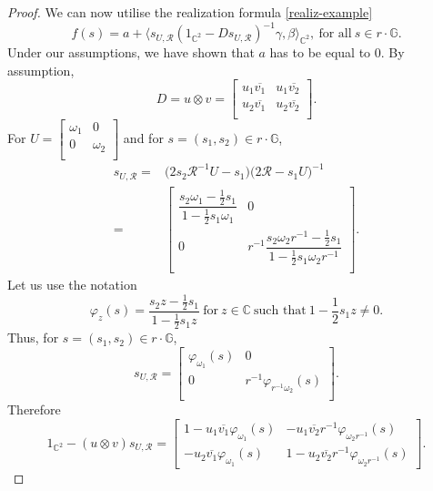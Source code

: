\documentclass[12pt,reqno]{amsart}
\numberwithin{equation}{section}
\renewcommand\phi{\varphi}
\theoremstyle{definition}
\begin{document}
\begin{proof}
We can now utilise the realization formula \eqref{realiz-example}
\begin{equation}\label{realiz-example-2}
f(s)=a+\langle s_{U,\mathcal{R}}(1_{\mathbb{C}^{2}}-Ds_{U,\mathcal{R}})^{-1}\gamma, \beta \rangle_{\mathbb{C}^{2}}, \ \text{for all} \ s\in r\cdot\mathbb{G}.
\end{equation}
Under our assumptions, we have shown that $a$ has to be equal to $0$. By assumption, 
$$D =u\otimes v = \begin{bmatrix}
    u_{1}\overline{v_{1}} & u_{1}\overline{v_{2}} \\
    u_{2}\overline{v_{1}} & u_{2}\overline{v_{2}} \\
\end{bmatrix}.$$
For $U=\begin{bmatrix}
\omega_{1} & 0 \\
0 & \omega_{2} \\
\end{bmatrix}$ and for $s= (s_1, s_2) \in r\cdot\mathbb{G}$,
\begin{align}
s_{U,\mathcal{R}} = & \bigg(2s_{2}\mathcal{R}^{-1}U-s_{1}\bigg)\bigg(2\mathcal{R}-s_{1}U\bigg)^{-1}\\
  =&  \begin{bmatrix}
   \dfrac{s_{2} \omega_1-\frac{1}{2}s_{1}}{1-\frac{1}{2}s_{1} \omega_1}  & 0 \\
    0 &  r^{-1} \dfrac{s_{2}\omega_{2}r^{-1} -\frac{1}{2}s_{1}}{1-\frac{1}{2}s_{1} \omega_{2}r^{-1}   } \\
\end{bmatrix}.
\end{align}
Let us use the notation
$$
\phi_{z}(s) = \dfrac{s_{2}z-\frac{1}{2}s_{1}}{1-\frac{1}{2}s_{1}z} \ \text{for} \ z\in\mathbb{C} \ \text{such that}~1-\frac{1}{2}s_{1}z\neq0.
$$
Thus, for $s= (s_1, s_2) \in r\cdot\mathbb{G}$, 
$$ s_{U,\mathcal{R}} = \begin{bmatrix}
 \phi_{\omega_1}(s)   & 0 \\
    0 &  r^{-1}  \phi_{r^{-1}\omega_2}(s)  \\
\end{bmatrix}.
$$
Therefore
$$1_{\mathbb{C}^{2}}-( u\otimes v )s_{U,\mathcal{R}} = \begin{bmatrix}
    1-u_{1}\overline{v_{1}}\phi_{\omega_{1}}(s) & -u_{1}\overline{v_{2}}r^{-1}\phi_{\omega_{2}r^{-1}}(s)\\
    -u_{2}\overline{v_{1}}\phi_{\omega_{1}}(s) & 1-u_{2}\overline{v_{2}}r^{-1}\phi_{\omega_{2}r^{-1}}(s)
\end{bmatrix}.$$

\end{proof}
\end{document}
